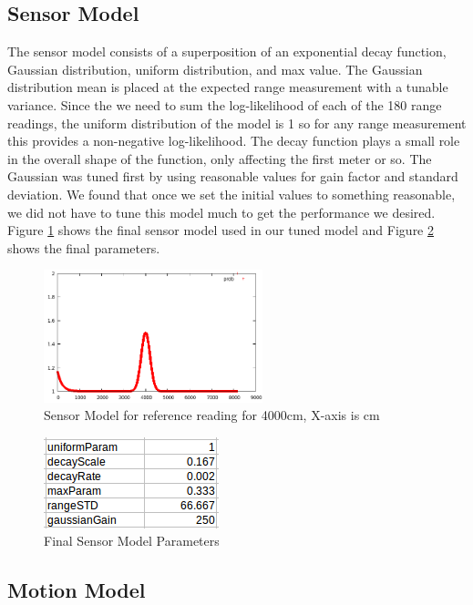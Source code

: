 \documentclass{article}
\begin{document}
\subsection{Sensor Model}
	The sensor model consists of a superposition of an exponential decay function, Gaussian distribution, uniform distribution, and max value.  The Gaussian distribution mean is placed at the expected range measurement with a tunable variance. Since the we need to sum the log-likelihood of each of the 180 range readings, the uniform distribution of the model is 1 so for any range measurement this provides a non-negative log-likelihood. The decay function plays a small role in the overall shape of the function, only affecting the first meter or so. The Gaussian was tuned first by using reasonable values for gain factor and standard deviation.  We found that once we set the initial values to something reasonable, we did not have to tune this model much to get the performance we desired. Figure \ref{fig:2} shows the final sensor model used in our tuned model and Figure \ref{fig:3} shows the final parameters.
\begin{figure}[!h]
    \centering
    \includegraphics[width=2.5in]{media/sensor_model.png}
    \caption{Sensor Model for reference reading for 4000cm, X-axis is cm}
\label{fig:2}
\end{figure}

\begin{figure}[!h]
    \centering
    \includegraphics[width=2.0in]{media/sensor_model_parameters.png}
    \caption{Final Sensor Model Parameters}
\label{fig:3}
\end{figure}

\subsection{Motion Model}
\end{document}
